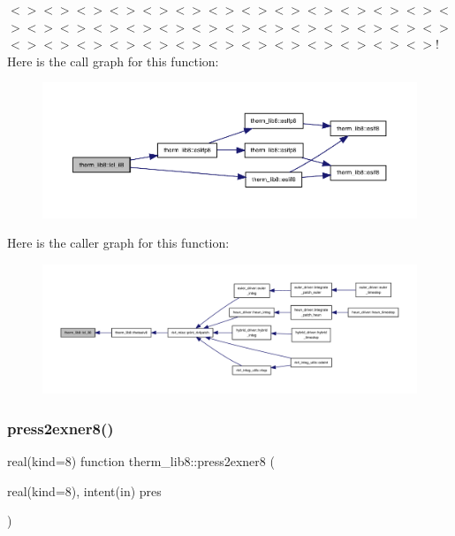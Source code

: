 $<$$>$$<$$>$$<$$>$$<$$>$$<$$>$$<$$>$$<$$>$$<$$>$$<$$>$$<$$>$$<$$>$$<$$>$$<$$>$$<$$>$$<$$>$$<$$>$$<$$>$$<$$>$$<$$>$$<$$>$$<$$>$$<$$>$$<$$>$$<$$>$$<$$>$$<$$>$$<$$>$$<$$>$$<$$>$$<$$>$$<$$>$$<$$>$$<$$>$$<$$>$$<$$>$$<$$>$$<$$>$$<$$>$$<$$>$$<$$>$! Here is the call graph for this function\+:
\nopagebreak
\begin{figure}[H]
\begin{center}
\leavevmode
\includegraphics[width=350pt]{namespacetherm__lib8_a0f6906696662a832ed73b03f8f97e449_cgraph}
\end{center}
\end{figure}
Here is the caller graph for this function\+:
\nopagebreak
\begin{figure}[H]
\begin{center}
\leavevmode
\includegraphics[width=350pt]{namespacetherm__lib8_a0f6906696662a832ed73b03f8f97e449_icgraph}
\end{center}
\end{figure}
\mbox{\label{namespacetherm__lib8_affcedde7d4e3f1d858091ea47c58186f}} 
\subsubsection{\texorpdfstring{press2exner8()}{press2exner8()}}
{\footnotesize\ttfamily real(kind=8) function therm\+\_\+lib8\+::press2exner8 (\begin{DoxyParamCaption}\item[{real(kind=8), intent(in)}]{pres }\end{DoxyParamCaption})}

